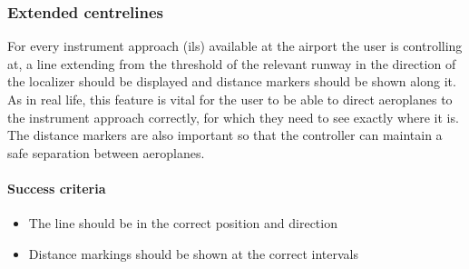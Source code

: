 \documentclass{article}
\begin{document}
\subsubsection{Extended centrelines}
For every instrument approach (\acrshort{ils}) available at the airport the user is controlling at, a line extending from the threshold of the relevant runway in the direction of the localizer should be displayed and distance markers should be shown along it.
As in real life, this feature is vital for the user to be able to direct aeroplanes to the instrument approach correctly, for which they need to see exactly where it is.
The distance markers are also important so that the controller can maintain a safe separation between aeroplanes.

\paragraph{Success criteria}
\begin{itemize}
    \item The line should be in the correct position and direction
    \item Distance markings should be shown at the correct intervals
\end{itemize}
\end{document}
